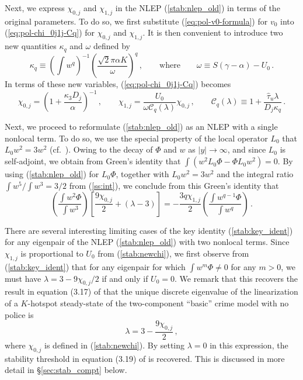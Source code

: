 \documentclass{article}%
\begin{document}
Next, we express $\chi_{0,j}$ and $\chi_{1,j}$ in the NLEP
(\ref{stab:nlep_old}) in terms of the original parameters. To do so,
we first substitute (\ref{eq:pol-v0-formula}) for $v_0$ into
(\ref{eq:pol-chi_0j1j-Cq}) for $\chi_{0,j}$ and $\chi_{1,j}$. It is
then convenient to introduce two new quantities $\kappa_q$ and
$\omega$ defined by
\begin{equation}\label{stab:kappa_omega}
   \kappa_q \equiv \left( \int w^q \right)^{-1} 
  \left( \frac{\sqrt{2} \pi \alpha K}{\omega} \right)^{q} \,, \qquad
  \mbox{where} \qquad \omega \equiv S (\gamma -\alpha) - U_0 \,.
\end{equation}
In terms of these new variables, (\ref{eq:pol-chi_0j1j-Cq}) becomes
\begin{equation}\label{stab:newchi}
    \chi_{0,j} = \left( 1 + \frac{\kappa_3 D_j}{\alpha} \right)^{-1} \,,
  \qquad \chi_{1,j} = \frac{U_0}{\omega {\mathcal C}_q(\lambda)} \chi_{0,j}
   \,, \qquad 
{\mathcal C}_{q}(\lambda) \equiv 1+\frac{\hat{\tau}_u\lambda}{D_j \kappa_q} \,.
\end{equation} 

Next, we proceed to reformulate (\ref{stab:nlep_old}) as an NLEP
with a single nonlocal term. To do so, we use the special property of
the local operator $L_0$ that $L_{0}w^{2}=3w^{2}$
(cf.~\cite{kww_crime}). Owing to the decay of $\Phi$ and $w$ as
$|y|\to \infty$, and since $L_0$ is self-adjoint, we obtain from
Green's identity that $\int\left(w^{2}L_{0}\Phi-\Phi
L_{0}w^{2}\right)=0$. By using (\ref{stab:nlep_old}) for $L_0\Phi$,
together with $L_0w^2 = 3 w^2$ and the integral ratio
${\int w^5/\int w^3}={3/2}$ from (\ref{ss:int}), we conclude from this
Green's identity that
\begin{equation}\label{stab:key_ident}
   \left( \frac{\int w^2 \Phi}{\int w^3 }\right) \left[
   \frac{9\chi_{0,j}}{2} + (\lambda -3) \right] =
   - \frac{3q\chi_{1,j}}{2} \left( \frac{\int w^{q-1} \Phi}{\int w^q }\right) \,.
\end{equation}

There are several interesting limiting cases of the key identity
(\ref{stab:key_ident}) for any eigenpair of the NLEP
(\ref{stab:nlep_old}) with two nonlocal terms. Since $\chi_{1,j}$ is
proportional to $U_0$ from (\ref{stab:newchi}), we first observe from
(\ref{stab:key_ident}) that for any eigenpair for which $\int w^{m}\Phi
\neq 0$ for any $m>0$, we must have $\lambda=3 - {9\chi_{0,j}/2}$ if
and only if $U_0=0$.  We remark that this recovers the result in
equation (3.17) of \cite{kww_crime} that the unique discrete
eigenvalue of the linearization of a $K$-hotspot steady-state of the
two-component ``basic'' crime model with no police is
\begin{equation}\label{stab:no_police}
    \lambda = 3 - \frac{9 \chi_{0,j}}{2} \,,  
\end{equation}
where $\chi_{0,j}$ is defined in (\ref{stab:newchi}).  By setting
$\lambda=0$ in this expression, the stability threshold in equation
(3.19) of \cite{kww_crime} is recovered. This is discussed in more
detail in \S \ref{sec:stab_compt} below. 
\end{document}
